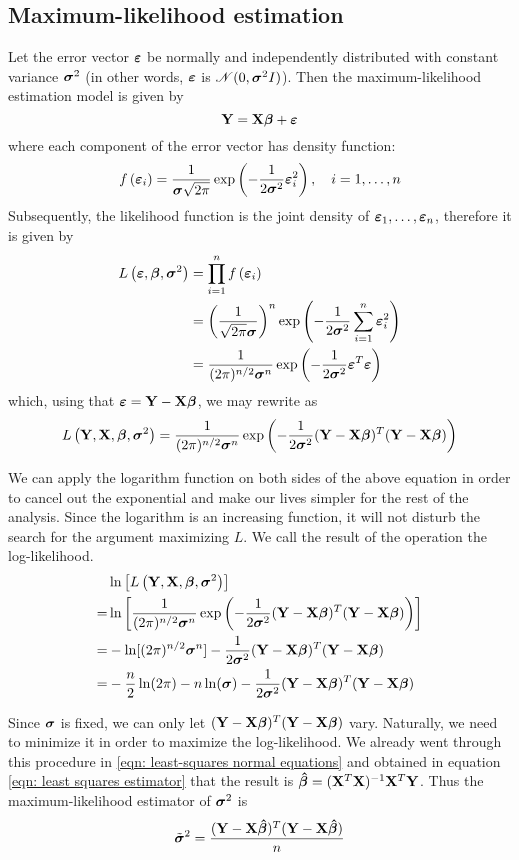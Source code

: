 \subsection{Maximum-likelihood estimation}
Let the error vector \(\boldsymbol{\varepsilon}\) be normally and independently distributed with constant variance \(\boldsymbol{\sigma}^2\) (in other words, \(\boldsymbol{\varepsilon}\) is \(\mathscr{N}(0, \boldsymbol{\sigma}^2 I)\)). Then the maximum-likelihood estimation model is given by
\[
    \mathbf{Y} = \mathbf{X} \boldsymbol{\beta} + \boldsymbol{\varepsilon}
\]
where each component of the error vector has density function:
\[
    f \left(\boldsymbol{\varepsilon}_{i}\right) = \frac{1}{\boldsymbol{\sigma} \sqrt{2 \pi}} \exp \left(-\frac{1}{2 \boldsymbol{\sigma}^{2}} \boldsymbol{\varepsilon}_{i}^{2}\right), \quad i = 1, \ldots, n
\]
Subsequently, the likelihood function is the joint density of \(\boldsymbol{\varepsilon}_1, \ldots, \boldsymbol{\varepsilon}_n\), therefore it is given by
\begin{align*}
    L\left(\boldsymbol{\varepsilon}, \boldsymbol{\beta}, \boldsymbol{\sigma}^{2}\right)
     & = \prod_{i=1}^{n} f\left(\boldsymbol{\varepsilon}_{i}\right)                                                                        \\
     & = \left( \frac{1}{\sqrt{2 \pi} \boldsymbol{\sigma}} \right)^n \exp \left(-\frac{1}{2 \boldsymbol{\sigma}^{2}} \sum_{i=1}^{n} \boldsymbol{\varepsilon}_i^2 \right) \\
     & = \frac{1}{(2 \pi)^{n / 2} \boldsymbol{\sigma}^{n}} \exp \left(-\frac{1}{2 \boldsymbol{\sigma}^{2}} \boldsymbol{\varepsilon}^T \boldsymbol{\varepsilon}\right)                        \\
\end{align*}
which, using that \(\boldsymbol{\varepsilon} = \mathbf{Y} - \mathbf{X} \boldsymbol{\beta}\), we may rewrite as
\[
    L\left(\mathbf{Y}, \mathbf{X}, \boldsymbol{\beta}, \boldsymbol{\sigma}^{2}\right) = \frac{1}{(2 \pi)^{n / 2} \boldsymbol{\sigma}^{n}} \exp \left(-\frac{1}{2 \boldsymbol{\sigma}^{2}} ( \mathbf{Y} - \mathbf{X} \boldsymbol{\beta} )^T ( \mathbf{Y} - \mathbf{X} \boldsymbol{\beta} )\right)
\]

We can apply the logarithm function on both sides of the above equation in order to cancel out the exponential and make our lives simpler for the rest of the analysis. Since the logarithm is an increasing function, it will not disturb the search for the argument maximizing \(L\). We call the result of the operation the log-likelihood.
\begin{align*}
      & \ln \left[ L\left(\mathbf{Y}, \mathbf{X}, \boldsymbol{\beta}, \boldsymbol{\sigma}^{2}\right) \right]                                                                           \\
    = & \ln \left[ \frac{1}{(2 \pi)^{n / 2} \boldsymbol{\sigma}^{n}} \exp \left(-\frac{1}{2 \boldsymbol{\sigma}^{2}} ( \mathbf{Y} - \mathbf{X} \boldsymbol{\beta} )^T ( \mathbf{Y} - \mathbf{X} \boldsymbol{\beta} )\right) \right] \\
    = & - \ln [ (2 \pi)^{n / 2} \boldsymbol{\sigma}^{n} ] - \frac{1}{2 \boldsymbol{\sigma}^{2}} ( \mathbf{Y} - \mathbf{X} \boldsymbol{\beta} )^T ( \mathbf{Y} - \mathbf{X} \boldsymbol{\beta} )                                     \\
    = & - \frac{n}{2} \ln(2 \pi) -n \ln(\boldsymbol{\sigma}) - \frac{1}{2 \boldsymbol{\sigma}^{2}} ( \mathbf{Y} - \mathbf{X} \boldsymbol{\beta} )^T ( \mathbf{Y} - \mathbf{X} \boldsymbol{\beta} )                                  \\
\end{align*}

Since \(\boldsymbol{\sigma}\) is fixed, we can only let \(( \mathbf{Y} - \mathbf{X} \boldsymbol{\beta} )^T ( \mathbf{Y} - \mathbf{X} \boldsymbol{\beta} )\) vary. Naturally, we need to minimize it in order to maximize the log-likelihood. We already went through this procedure in \eqref{eqn: least-squares normal equations} and obtained in equation \eqref{eqn: least squares estimator} that the result is \(\boldsymbol{\hat{\beta}} = (\mathbf{X}^T \mathbf{X})^{-1} \mathbf{X}^T \mathbf{Y}\). Thus the maximum-likelihood estimator of \(\boldsymbol{\sigma}^2\) is
\[
    \tilde {\boldsymbol{\sigma}}^2 = \frac{( \mathbf{Y} - \mathbf{X} \boldsymbol{\hat{\beta}} )^T ( \mathbf{Y} - \mathbf{X} \boldsymbol{\hat{\beta}} )}{n}
\]